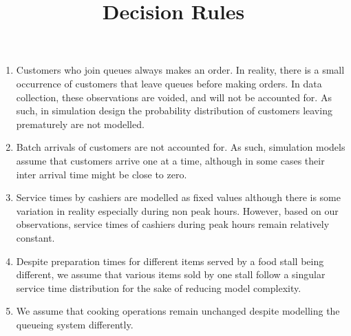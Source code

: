 \documentclass{article}
\begin{document}
\pagecolor{ultramarine}
\title{Decision Rules}
\author{}
\date{}
\maketitle
\begin{enumerate}
    \item Customers who join queues always makes an order. In reality, there is a small occurrence of customers that leave queues before making orders. In data collection, these observations are voided, and will not be accounted for. As such, in simulation design the probability distribution of customers leaving prematurely are not modelled.
    \item Batch arrivals of customers are not accounted for. As such, simulation models assume that customers arrive one at a time, although in some cases their inter arrival time might be close to zero.
    \item Service times by cashiers are modelled as fixed values although there is some variation in reality especially during non peak hours. However, based on our observations, service times of cashiers during peak hours remain relatively constant.
    \item Despite preparation times for different items served by a food stall being different, we assume that various items sold by one stall follow a singular service time distribution for the sake of reducing model complexity.
    \item We assume that cooking operations remain unchanged despite modelling the queueing system differently.
\end{enumerate}
\end{document}
